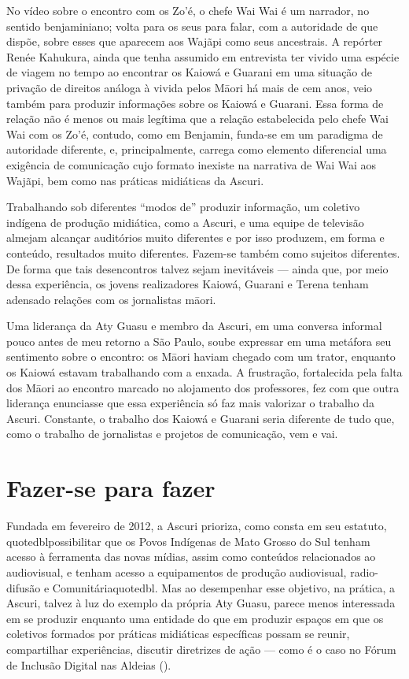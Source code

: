 {{No vídeo sobre o encontro com os Zo’é, o chefe Wai Wai é um narrador, no
sentido benjaminiano; volta para os seus para falar, com a autoridade de que dispõe, sobre esses que aparecem aos Wajãpi como seus
ancestrais. A repórter Renée Kahukura, ainda que tenha assumido em
entrevista ter vivido uma espécie de viagem no tempo ao encontrar os
Kaiowá e Guarani em uma situação de privação de direitos análoga à
vivida pelos M\=aori há mais de cem anos, veio também para produzir
informações sobre os Kaiowá e Guarani. Essa forma de relação não é
menos ou mais legítima que a relação estabelecida pelo chefe Wai Wai
com os Zo’é, contudo, como em Benjamin, funda-se em um paradigma de
autoridade diferente, e, principalmente, carrega como elemento
diferencial uma exigência de comunicação cujo formato inexiste na
narrativa de Wai Wai aos Wajãpi, bem como nas práticas midiáticas da
Ascuri.

Trabalhando sob diferentes ``modos de'' produzir informação, um coletivo
indígena de produção midiática, como a Ascuri, e uma equipe de
televisão almejam alcançar auditórios muito diferentes e por isso
produzem, em forma e conteúdo, resultados muito diferentes. Fazem-se
também como sujeitos diferentes. De forma que tais desencontros talvez
sejam inevitáveis --- ainda que, por meio dessa experiência, os jovens
realizadores Kaiowá, Guarani e Terena tenham adensado relações com os
jornalistas m\=aori.

Uma liderança da Aty Guasu e membro da Ascuri, em uma conversa informal
pouco antes de meu retorno a São Paulo, soube expressar em uma metáfora
seu sentimento sobre o encontro: os M\=aori haviam chegado com um
trator, enquanto os Kaiowá estavam trabalhando com a enxada. A
frustração, fortalecida pela falta dos M\=aori ao encontro marcado no
alojamento dos professores, fez com que outra liderança enunciasse que
essa experiência só faz mais valorizar o trabalho da Ascuri. Constante,
o trabalho dos Kaiowá e Guarani seria diferente de tudo que, como o
trabalho de jornalistas e projetos de comunicação, vem e vai.

\section{Fazer-se para fazer}

Fundada em fevereiro de 2012, a Ascuri prioriza, como consta em seu
estatuto, {quotedbl}possibilitar que os Povos Indígenas de Mato
Grosso do Sul tenham acesso à ferramenta das novas mídias, assim como
conteúdos relacionados ao audiovisual, e tenham acesso a equipamentos
de produção audiovisual, radio-difusão e  Comunitária{quotedbl}.
Mas ao desempenhar esse objetivo, na prática, a Ascuri, talvez à luz do
exemplo da própria Aty Guasu, parece menos interessada em se produzir
enquanto uma entidade do que em produzir espaços em que os coletivos
formados por práticas midiáticas específicas possam se reunir,
compartilhar experiências, discutir diretrizes de ação --- como é o caso
no Fórum de Inclusão Digital nas Aldeias ().

}}
